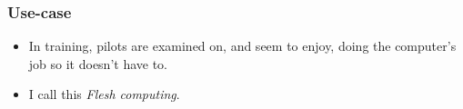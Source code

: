 \begin{frame}[fragile]
\frametitle{Use-case}
\begin{block}{}
\begin{itemize}
\item<1-> In training, pilots are examined on, and seem to enjoy, doing the computer's job so it doesn't have to.
\item<2-> I call this \emph{Flesh computing}.
\end{itemize}
\end{block}
\end{frame}
